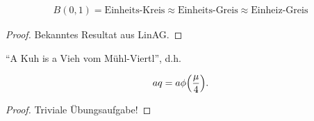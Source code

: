 \documentclass{article}
\begin{document}
\begin{theorem}

    \begin{align*}
        B(0, 1)
        =
        \text{Einheits-Kreis}
        \approx
        \text{Einheits-Greis}
        \approx
        \text{Einheiz-Greis}
    \end{align*}

\end{theorem}

\begin{proof}
    Bekanntes Resultat aus LinAG.
\end{proof}

\begin{theorem}

    \enquote{A Kuh is a Vieh vom Mühl-Viertl}, d.h.

    \begin{align*}
        a q = a \phi {\left ( \frac{\mu}{4} \right )}.
    \end{align*}

\end{theorem}

\begin{proof}
    Triviale Übungsaufgabe!
\end{proof}
\end{document}

